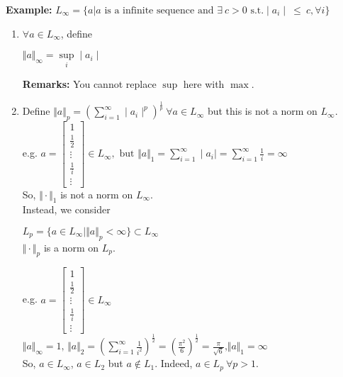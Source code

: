 \documentclass{article}
\begin{document}
\textbf{Example: } $L_\infty = \{a | a \text{ is a infinite sequence and } \exists \ c >  0 \text{ s.t.} \mid{a_i}\mid \ \leq \ c, \forall i\}$

\begin{enumerate}
    \item $\forall a \in L_\infty$, define
        \begin{center}
            $\Vert a \Vert_\infty = \underset{i}{\sup} \mid{a_i}\mid$
        \end{center}
        \textbf{Remarks:} You cannot replace $\sup$ here with $\max$.
    \item Define $\Vert a \Vert_p = (\sum_{i=1}^{\infty} \mid{a_i}\mid ^ p)^\frac{1}{p} \ \forall a \in L_\infty$ but this is not a norm on $L_\infty$. \\
    
    e.g. $a =\begin{bmatrix} 1 \\ \frac{1}{2} \\ \vdots  \\ \frac{1}{i} \\ \vdots \end{bmatrix} \in L_\infty, \text{ but } \Vert a \Vert_1 = \sum_{i=1}^{\infty} \mid{a_i}\mid = \sum_{i=1}^{\infty} \frac{1}{i} = \infty$ \\
    
    So, $\Vert \cdot \Vert_1$ is not a norm on $L_\infty$. \\
    Instead, we consider \\
        \begin{center}
            $L_p = \{a \in L_\infty | \Vert a \Vert_p <  \infty\} \subset L_\infty$ \\
            $\Vert \cdot \Vert_p$ is a norm on $L_p$.
        \end{center}
    e.g. $a =\begin{bmatrix} 1 \\ \frac{1}{2} \\ \vdots  \\ \frac{1}{i} \\ \vdots \end{bmatrix} \in L_\infty$ \\
    $\Vert a \Vert_\infty = 1 \text{, } \Vert a \Vert_2 = (\sum_{i=1}^{\infty} \frac{1}{i^2}) ^ \frac{1}{2} = (\frac{\pi^2}{6}) ^ \frac{1}{2} = \frac{\pi}{\sqrt{6}} \text{,} \Vert a \Vert_1 = \infty$ \\
    So, $a \in L_\infty$, $a \in L_2$ but $a \notin L_1$. Indeed, $a \in L_p \ \forall p > 1$. 
        
\end{enumerate}
\end{document}
